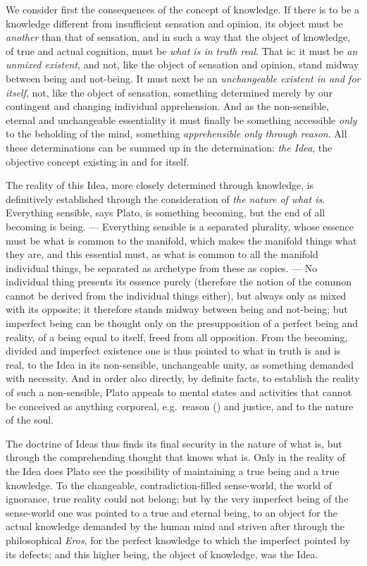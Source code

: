 We consider first the consequences of the concept of knowledge. If
there is to be a knowledge different from insufficient sensation and opinion, its object must be \emph{another} than
that of sensation, and in such a way that the object of knowledge, of
true and actual cognition, must be \emph{what is in truth real}. That is: it must be \emph{an unmixed
existent}, and not, like the object of sensation and opinion,
stand midway between being and not-being. It must next
be an \emph{unchangeable existent in and for itself}, not, like
the object of sensation, something determined merely by our contingent and changing individual apprehension. And as the non-sensible, eternal and unchangeable essentiality it must finally be
something accessible \emph{only} to the beholding of the mind, something \emph{apprehensible only through
reason}. All these determinations can
be summed up in the determination: \emph{the Idea}, the objective concept existing in and for itself.

The reality of this Idea, more closely determined through knowledge,
is definitively established through the consideration of \emph{the nature of what is}. Everything sensible, says Plato, is something becoming,
but the end of all becoming is being. --- Everything sensible is a separated
plurality, whose essence must be what is common to the manifold, which makes the manifold things what they are, and this
essential must, as what is common to all the manifold individual things, be separated as archetype from these as copies. ---
No individual thing presents its essence purely (therefore
the notion of the common cannot be derived from the individual things either), but always only as mixed with its opposite; it therefore stands midway between being and not-being;
but imperfect being can be thought only on the presupposition of a perfect being and reality, of a being equal to
itself, freed from all opposition. From the becoming, divided and imperfect existence one is thus pointed
to what in truth is and is real, to the Idea in its
non-sensible, unchangeable unity, as something demanded with necessity. And in order also directly, by definite facts,
to establish the reality of such a non-sensible, Plato appeals to mental states and activities
that cannot be conceived as anything corporeal, e.g.\ reason
() and justice, and to the nature of the soul.

The doctrine of Ideas thus finds its final security in the nature of what is, but through the comprehending thought that knows
what is. Only in the reality of the Idea does Plato see the possibility of maintaining a true being and a true knowledge. To the
changeable, contradiction-filled sense-world, the world of ignorance, true reality could not belong; but by the very
imperfect being of the sense-world one was pointed to a true
and eternal being, to an object for the actual knowledge demanded by the human mind
and striven after through the philosophical \emph{Eros},
for the perfect knowledge to which the imperfect pointed by its defects; and this higher being,
the object of knowledge, was the Idea.

